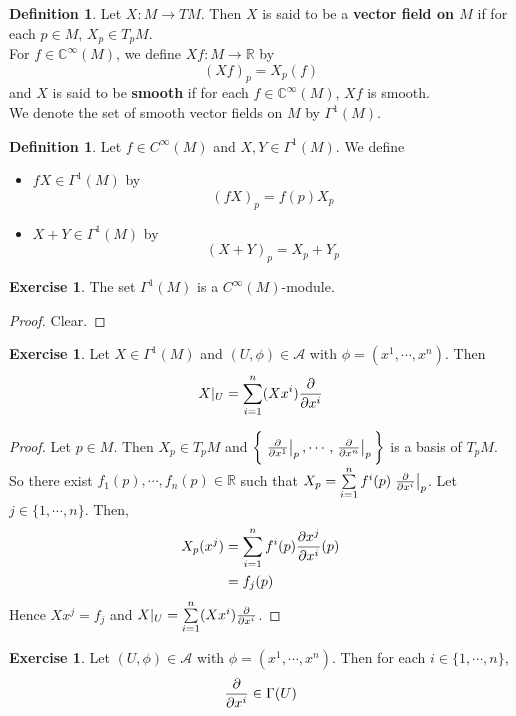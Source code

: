\documentclass[12pt]{amsart}
\theoremstyle{definition}
\newtheorem{defn}[definition]{Definition}
\newtheorem{ex}[definition]{Exercise}
\newcommand{\Gam}{\Gamma}
\newcommand{\C}{\mathbb{C}}
\newcommand{\R}{\mathbb{R}}
\newcommand{\MA}{\mathcal{A}}
\begin{document}
	\begin{defn}
		Let $X: M \rightarrow TM$. Then $X$ is said to be a \textbf{vector field on $M$} if for each $p \in M$, $X_p \in T_p M$. \\
		For $f \in \C^{\infty}(M)$, we define $Xf : M \rightarrow \R$ by $$(Xf)_p = X_p(f)$$ 
		and $X$ is said to be \textbf{smooth} if for each $f \in \C^{\infty}(M)$, $Xf$ is smooth.\\
		We denote the set of smooth vector fields on $M$ by $\Gam^1(M)$.
	\end{defn}

	\begin{defn}
	Let $f \in C^{\infty}(M)$ and $X,Y \in \Gam^1(M)$. We define 
	\begin{itemize}
	\item $fX \in \Gam^1(M)$ by $$(fX)_p = f(p)X_p$$
	\item $X+Y \in \Gam^1(M)$ by $$(X+Y)_p = X_p+Y_p$$
	\end{itemize}
	\end{defn}
	
	\begin{ex}
	The set $\Gam^1(M)$ is a $C^{\infty}(M)$-module.
	\end{ex}
	
	\begin{proof}
	Clear.
	\end{proof}

	\begin{ex}
		Let $X \in \Gam^1(M)$ and $(U, \phi) \in \MA$ with $\phi = (x^1, \cdots, x^n)$. Then $$X|_U = \sum_{i=1}^n (Xx^i) \pdv{x^i}$$ 
	\end{ex}

	\begin{proof}
		Let $p \in M$. Then $X_p \in T_pM$ and $\bigg \{ \eval{\pdv{x^1}}_{p}, \cdots, \eval{\pdv{x^n}}_{p} \bigg \}$ is a basis of $T_pM$. So there exist $f_1(p), \cdots, f_n(p) \in \R$ such that $X_p = \sum\limits_{i=1}^n f^i(p) \eval{\pdv{x^i}}_{p}$. Let $j \in \{1, \cdots, n\}$. Then,
		\begin{align*}
			X_p(x^j) 
			&= \sum\limits_{i=1}^n f^i(p) {\pdv{x^j}{x^i}}(p) \\
			&= f_j(p) \\
		\end{align*} 
		Hence $Xx^j = f_j$ and $X|_U = \sum\limits_{i=1}^n (Xx^i) \pdv{x^i}$.
	\end{proof}
	
	\begin{ex}
	Let $(U, \phi) \in \MA$ with $\phi = (x^1, \cdots, x^n)$. Then for each $i \in \{1, \cdots, n\}$, $$\pdv{x^i} \in \Gam(U)$$
	\end{ex}
	
\end{document}
